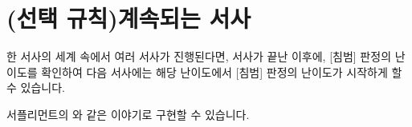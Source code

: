 \documentclass{report}
\begin{document}
	\section*{\hypertarget{the-story-continues}{(선택 규칙)계속되는 서사}}
	한 서사의 세계 속에서 여러 서사가 진행된다면, 서사가 끝난 이후에, [침범] 판정의 난이도를 확인하여 다음 서사에는 해당 난이도에서 [침범] 판정의 난이도가 시작하게 할 수 있습니다.
	
	서플리먼트의 와 같은 이야기로 구현할 수 있습니다.
\end{document}
